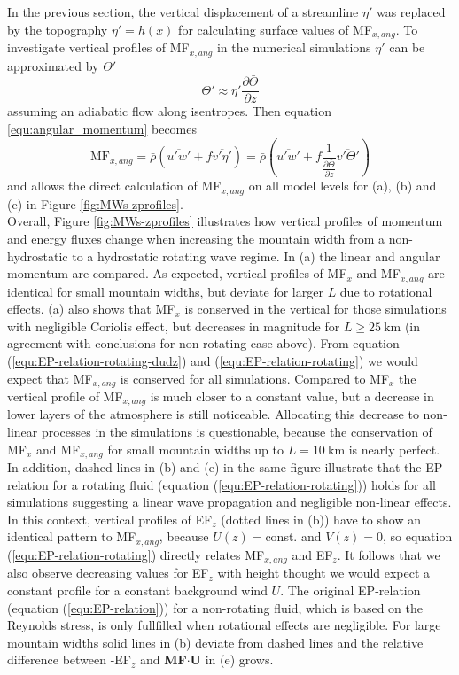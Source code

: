In the previous section, the vertical displacement of a streamline $\eta'$ was replaced by the topography $\eta'=h(x)$ for calculating surface values of MF$_{x,ang}$. To investigate vertical profiles of MF$_{x,ang}$ in the numerical simulations $\eta'$ can be approximated by $\Theta'$
\begin{equation}
    \Theta' \approx  \eta' \frac{\partial \bar{\Theta}}{\partial z}
    \label{equ:thprime}
\end{equation}
assuming an adiabatic flow along isentropes. Then equation \ref{equ:angular_momentum} becomes
\begin{equation}
    \mathrm{MF}_{x,ang} = \bar{\rho} (\overbar{u'w'} + f \overbar{v' \eta'}) = \bar{\rho} (\overbar{u'w'} + f \frac{1}{\frac{\partial \bar{\Theta}}{\partial z}}\overbar{v' \Theta'})
    \label{equ:angular_momentum_theta}
\end{equation}
and allows the direct calculation of MF$_{x,ang}$ on all model levels for (a), (b) and (e) in Figure \ref{fig:MWs-zprofiles}. \\ 
Overall, Figure \ref{fig:MWs-zprofiles} illustrates how vertical profiles of momentum and energy fluxes change when increasing the mountain width from a non-hydrostatic to a hydrostatic rotating wave regime. In (a) the linear and angular momentum are compared. As expected, vertical profiles of MF$_x$ and MF$_{x,ang}$ are identical for small mountain widths, but deviate for larger $L$ due to rotational effects. (a) also shows that MF$_x$ is conserved in the vertical for those simulations with negligible Coriolis effect, but decreases in magnitude for $L \geq \SI{25}{\kilo\meter}$ (in agreement with conclusions for non-rotating case above). From equation (\ref{equ:EP-relation-rotating-dudz}) and (\ref{equ:EP-relation-rotating}) we would expect that MF$_{x,ang}$ is conserved for all simulations. Compared to MF$_x$ the vertical profile of MF$_{x,ang}$ is much closer to a constant value, but a decrease in lower layers of the atmosphere is still noticeable. Allocating this decrease to non-linear processes in the simulations is questionable, because the conservation of MF$_x$ and MF$_{x,ang}$ for small mountain widths up to $L=\SI{10}{\kilo\meter}$ is nearly perfect. In addition, dashed lines in (b) and (e) in the same figure illustrate that the EP-relation for a rotating fluid (equation (\ref{equ:EP-relation-rotating})) holds for all simulations suggesting a linear wave propagation and negligible non-linear effects. In this context, vertical profiles of EF$_z$ (dotted lines in (b)) have to show an identical pattern to MF$_{x,ang}$, because $U(z)=$const. and $V(z)=0$, so equation (\ref{equ:EP-relation-rotating}) directly relates MF$_{x,ang}$ and EF$_z$. It follows that we also observe decreasing values for EF$_z$ with height thought we would expect a constant profile for a constant background wind $U$. The original EP-relation (equation (\ref{equ:EP-relation})) for a non-rotating fluid, which is based on the Reynolds stress, is only fullfilled when rotational effects are negligible. For large mountain widths solid lines in (b) deviate from dashed lines and the relative difference between -EF$_z$ and \textbf{MF}$\cdot$\textbf{U} in (e) grows. \\

